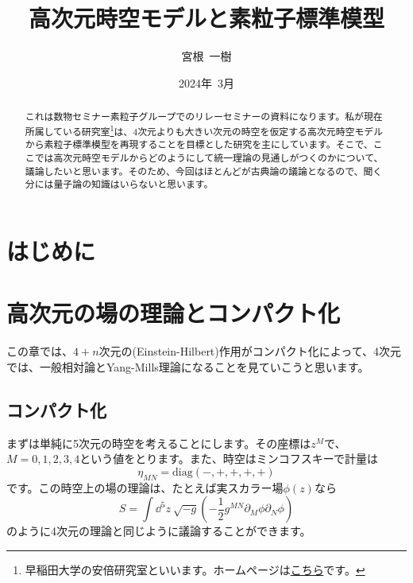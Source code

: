 \documentclass[unicode,a4paper,10pt]{ltjsarticle}
\title{高次元時空モデルと素粒子標準模型}
\author{宮根\ 一樹}
\date{2024年\ 3月}
\begin{document}
\maketitle

\begin{abstract}
   これは数物セミナー素粒子グループでのリレーセミナーの資料になります。私が現在所属している研究室\footnote{
      早稲田大学の安倍研究室といいます。ホームページは\href{http://www.hep.phys.waseda.ac.jp/index-j.html}{こちら}です。
   }は、4次元よりも大きい次元の時空を仮定する高次元時空モデルから素粒子標準模型を再現することを目標とした研究を主にしています。そこで、ここでは高次元時空モデルからどのようにして統一理論の見通しがつくのかについて、議論したいと思います。そのため、今回はほとんどが古典論の議論となるので、聞く分には量子論の知識はいらないと思います。
\end{abstract}

\tableofcontents

\clearpage

\section{はじめに}


\clearpage

\section{高次元の場の理論とコンパクト化}

この章では、$4+n$次元の(Einstein-Hilbert)作用がコンパクト化によって、4次元では、一般相対論とYang-Mills理論になることを見ていこうと思います。


\subsection{コンパクト化}

まずは単純に5次元の時空を考えることにします。その座標は$z^{M}$で、$M=0,1,2,3,4$という値をとります。また、時空はミンコフスキーで計量は
\begin{equation}
   \eta_{MN}
   =
   \text{diag}(-,+,+,+,+)
\end{equation}
です。この時空上の場の理論は、たとえば実スカラー場$\phi(z)$なら
\begin{equation}
   S
   =
   \int\dd^5 z\ \sqrt{-g}
   \left(  
      -\frac{1}{2}
      g^{MN}\partial_{M}\phi\partial_{N}\phi
   \right)
   \label{eqn:action_5d_real_scalar}
\end{equation}
のように4次元の理論と同じように議論することができます。
\end{document}
